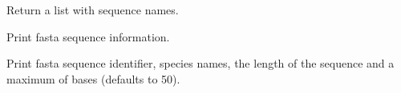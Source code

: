 \documentclass[letterpaper,10pt,english]{sphinxmanual}
\begin{document}
\begin{fulllineitems}
\begin{fulllineitems}
\end{fulllineitems}


\begin{fulllineitems}
\label{fasta:libPoMo.fasta.FaSeq.get_seq_names}
Return a list with sequence names.

\end{fulllineitems}


\begin{fulllineitems}
\label{fasta:libPoMo.fasta.FaSeq.print_info}
Print fasta sequence information.

Print fasta sequence identifier, species names, the length of
the sequence and a maximum of  bases (defaults to 50).

\end{fulllineitems}


\end{fulllineitems}

\end{document}
